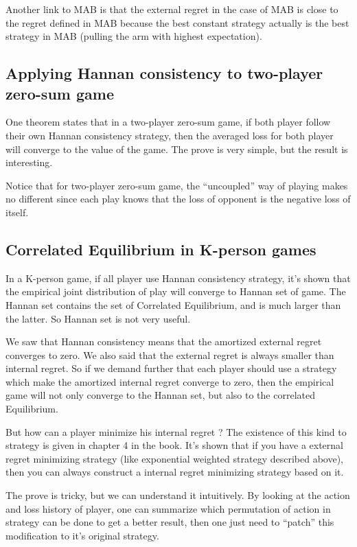 \documentclass{article} %
\begin{document}
Another link to MAB is that the external regret in the case of MAB is close to the regret defined in MAB because the best constant strategy actually is the best strategy in MAB (pulling the arm with highest expectation).

\subsection{Applying Hannan consistency to two-player zero-sum game}
One theorem states that in a two-player zero-sum game, if both player follow their own Hannan consistency strategy, then the averaged loss for both player will converge to the value of the game. The prove is very simple, but the result is interesting. 

Notice that for two-player zero-sum game, the ``uncoupled'' way of playing makes no different since each play knows that the loss of opponent is the negative loss of itself.

\subsection{Correlated Equilibrium in K-person games}
In a K-person game, if all player use Hannan consistency strategy, it's shown that the empirical joint distribution of play will converge to Hannan set of game. The Hannan set contains the set of Correlated Equilibrium, and is much larger than the latter. So Hannan set is not very useful.

We saw that Hannan consistency means that the amortized external regret converges to zero. We also said that the external regret is always smaller than internal regret. So if we demand further that each player should use a strategy which make the amortized internal regret converge to zero, then the empirical game will not only converge to the Hannan set, but also to the correlated Equilibrium.

But how can a player minimize his internal regret ? The existence of this kind to strategy is given in chapter 4 in the book. It's shown that if you have a external regret minimizing strategy (like exponential weighted strategy described above), then you can always construct a internal regret minimizing strategy based on it.

The prove is tricky, but we can understand it intuitively. By looking at the action and loss history of player, one can summarize which permutation of action in strategy can be done to get a better result, then one just need to ``patch'' this modification to it's original strategy.
\end{document}
